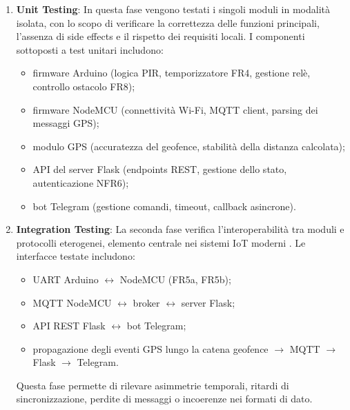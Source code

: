 \begin{enumerate}
    \item \textbf{Unit Testing}: In questa fase vengono testati i singoli moduli in modalità isolata, con lo scopo di verificare la correttezza delle funzioni principali, l'assenza di side effects e il rispetto dei requisiti locali. I componenti sottoposti a test unitari includono:
    \begin{itemize}
        \item firmware Arduino (logica PIR, temporizzatore FR4, gestione relè, controllo ostacolo FR8);
        \item firmware NodeMCU (connettività Wi-Fi, MQTT client, parsing dei messaggi GPS);
        \item modulo GPS (accuratezza del geofence, stabilità della distanza calcolata);
        \item API del server Flask (endpoints REST, gestione dello stato, autenticazione NFR6);
        \item bot Telegram (gestione comandi, timeout, callback asincrone).
    \end{itemize}
    
    \item \textbf{Integration Testing}: La seconda fase verifica l'interoperabilità tra moduli e protocolli eterogenei, elemento centrale nei sistemi IoT moderni \cite{Gubbi2013}. Le interfacce testate includono:
    \begin{itemize}
        \item UART Arduino $\leftrightarrow$ NodeMCU (FR5a, FR5b);
        \item MQTT NodeMCU $\leftrightarrow$ broker $\leftrightarrow$ server Flask;
        \item API REST Flask $\leftrightarrow$ bot Telegram;
        \item propagazione degli eventi GPS lungo la catena geofence $\rightarrow$ MQTT $\rightarrow$ Flask $\rightarrow$ Telegram.
    \end{itemize}
    Questa fase permette di rilevare asimmetrie temporali, ritardi di sincronizzazione, perdite di messaggi o incoerenze nei formati di dato.


\end{enumerate}
